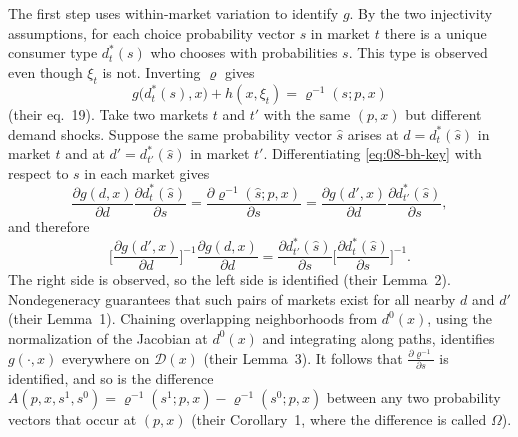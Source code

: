 The first step uses within-market variation to identify $g$. By the two injectivity assumptions, for each choice
probability vector $s$ in market $t$ there is a unique consumer type $d^*_t(s)$ who chooses with probabilities $s$. This
type is observed even though $\xi_t$ is not. Inverting $\varrho$ gives
\begin{equation}\label{eq:08-bh-key}
  g\big(d^*_t(s), x\big) + h(x, \xi_t) = \varrho^{-1}(s; p, x)
\end{equation}
(their eq.~19). Take two markets $t$ and $t'$ with the same $(p, x)$ but different demand shocks. Suppose the
same probability vector $\hat s$ arises at $d = d^*_t(\hat s)$ in market $t$ and at $d' = d^*_{t'}(\hat s)$ in market
$t'$. Differentiating \eqref{eq:08-bh-key} with respect to $s$ in each market gives
\begin{equation*}
  \frac{\partial g(d, x)}{\partial d}\frac{\partial d^*_t(\hat s)}{\partial s}
  = \frac{\partial\varrho^{-1}(\hat s; p, x)}{\partial s}
  = \frac{\partial g(d', x)}{\partial d}\frac{\partial d^*_{t'}(\hat s)}{\partial s} ,
\end{equation*}
and therefore
\begin{equation*}
  \Big[\frac{\partial g(d', x)}{\partial d}\Big]^{-1}\frac{\partial g(d, x)}{\partial d}
  = \frac{\partial d^*_{t'}(\hat s)}{\partial s}\Big[\frac{\partial d^*_t(\hat s)}{\partial s}\Big]^{-1} .
\end{equation*}
The right side is observed, so the left side is identified (their Lemma~2). Nondegeneracy guarantees that such pairs
of markets exist for all nearby $d$ and $d'$ (their Lemma~1). Chaining overlapping neighborhoods from $d^0(x)$, using the
normalization of the Jacobian at $d^0(x)$ and integrating along paths, identifies $g(\cdot, x)$ everywhere on
$\mathcal{D}(x)$ (their Lemma~3). It follows that $\frac{\partial\varrho^{-1}}{\partial s}$ is identified, and so is the
difference $A(p, x, s^1, s^0) = \varrho^{-1}(s^1; p, x) - \varrho^{-1}(s^0; p, x)$ between any two probability vectors
that occur at $(p, x)$ (their Corollary~1, where the difference is called $\Omega$).

